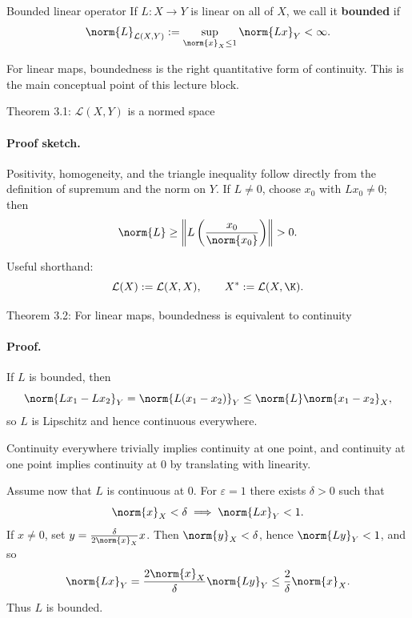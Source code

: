 \documentclass[11pt]{article}
\begin{document}
\begin{defbox}{Bounded linear operator}
If $L:X\to Y$ is linear on all of $X$, we call it \textbf{bounded} if
\[
\norm{L}_{\mathcal L(X,Y)}:=\sup_{\norm{x}_X\le 1}\norm{Lx}_Y<\infty.
\]
\end{defbox}

\begin{focusbox}
For linear maps, boundedness is the right quantitative form of continuity. This is the main conceptual point of this lecture block.
\end{focusbox}

\begin{thmbox}{Theorem 3.1: $\mathcal L(X,Y)$ is a normed space}
\thmOperatorNorm
\end{thmbox}

\paragraph{Proof sketch.}
Positivity, homogeneity, and the triangle inequality follow directly from the definition of supremum and the norm on $Y$. If $L\neq 0$, choose $x_0$ with $Lx_0\neq 0$; then
\[
\norm{L}\ge \left\|L\left(\frac{x_0}{\norm{x_0}}\right)\right\|>0.
\]

\begin{focusbox}
Useful shorthand:
\[
\mathcal L(X):=\mathcal L(X,X),
\qquad
X^*:=\mathcal L(X,\K).
\]
\end{focusbox}

\begin{thmbox}{Theorem 3.2: For linear maps, boundedness is equivalent to continuity}
\thmBoundedIffContinuous
\end{thmbox}

\paragraph{Proof.}
If $L$ is bounded, then
\[
\norm{Lx_1-Lx_2}_Y=\norm{L(x_1-x_2)}_Y\le \norm{L}\norm{x_1-x_2}_X,
\]
so $L$ is Lipschitz and hence continuous everywhere.

Continuity everywhere trivially implies continuity at one point, and continuity at one point implies continuity at $0$ by translating with linearity.

Assume now that $L$ is continuous at $0$. For $\varepsilon=1$ there exists $\delta>0$ such that
\[
\norm{x}_X<\delta \implies \norm{Lx}_Y<1.
\]
If $x\neq 0$, set $y=\frac{\delta}{2\norm{x}_X}x$. Then $\norm{y}_X<\delta$, hence $\norm{Ly}_Y<1$, and so
\[
\norm{Lx}_Y=\frac{2\norm{x}_X}{\delta}\norm{Ly}_Y\le \frac{2}{\delta}\norm{x}_X.
\]
Thus $L$ is bounded.
\end{document}

